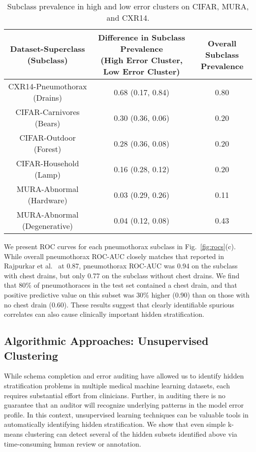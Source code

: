 \documentclass[sigconf]{acmart}
\begin{document}
 \begin{table*}[]
 \centering
\begin{tabular}{ccc}
\toprule
 Dataset-Superclass (Subclass) & \makecell{Difference in Subclass Prevalence \\ (High Error Cluster, Low Error Cluster)}  & \makecell{Overall Subclass \\ Prevalence} \\
 \toprule
 CXR14-Pneumothorax (Drains) & 0.68 (0.17, 0.84) & 0.80\\
 CIFAR-Carnivores (Bears) & 0.30 (0.36, 0.06) & 0.20\\
 CIFAR-Outdoor (Forest) & 0.28 (0.36, 0.08) & 0.20\\
 CIFAR-Household (Lamp) & 0.16 (0.28, 0.12) & 0.20\\
 MURA-Abnormal (Hardware) & 0.03 (0.29, 0.26) & 0.11\\
 MURA-Abnormal (Degenerative) & 0.04 (0.12, 0.08) & 0.43\\
 \toprule
\end{tabular}
\caption{ Subclass prevalence in high and low error clusters on CIFAR, MURA, and CXR14.}
\label{tab:clustercifar-1}
\end{table*}

We present ROC curves for each pneumothorax subclass in Fig.~\ref{fig:rocs}(c).  
While overall pneumothorax ROC-AUC closely matches that reported in Rajpurkar et al.~\citep{rajpurkar2017chexnet} at 0.87, pneumothorax ROC-AUC was 0.94 on the subclass with chest drains, but only 0.77 on the subclass without chest drains.  
We find that 80\% of pneumothoraces in the test set contained a chest drain, and that positive predictive value on this subset was 30\% higher (0.90) than on those with no chest drain (0.60).  
These results suggest that clearly identifiable spurious correlates can also cause clinically important hidden stratification.

\subsection{Algorithmic Approaches: Unsupervised Clustering}

While schema completion and error auditing have allowed us to identify hidden stratification problems in multiple medical machine learning datasets, each requires substantial effort from clinicians.
Further, in auditing there is no guarantee that an auditor will recognize underlying patterns in the model error profile.
In this context, unsupervised learning techniques can be valuable tools in automatically identifying hidden stratification.
We show that even simple k-means clustering can detect several of the hidden subsets identified above via time-consuming human review or annotation.
\end{document}
